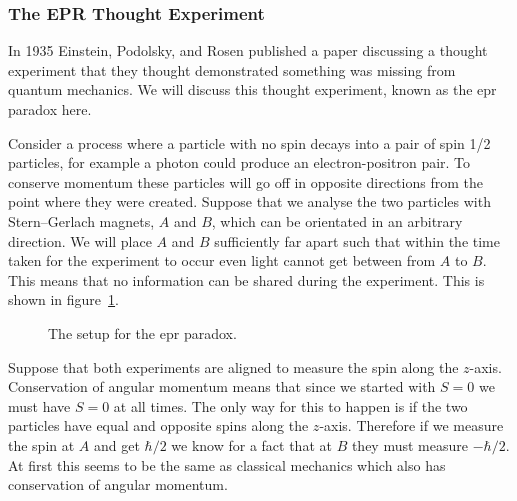     \subsubsection{The EPR Thought Experiment}
    In 1935 Einstein, Podolsky, and Rosen published a paper discussing a thought experiment that they thought demonstrated something was missing from quantum mechanics.
    We will discuss this thought experiment, known as the \gls{epr} paradox here.
    
    Consider a process where a particle with no spin decays into a pair of spin 1/2 particles, for example a photon could produce an electron-positron pair.
    To conserve momentum these particles will go off in opposite directions from the point where they were created.
    Suppose that we analyse the two particles with Stern--Gerlach magnets, \(A\) and \(B\), which can be orientated in an arbitrary direction.
    We will place \(A\) and \(B\) sufficiently far apart such that within the time taken for the experiment to occur even light cannot get between from \(A\) to \(B\).
    This means that no information can be shared during the experiment.
    This is shown in figure~\ref{fig:epr setup}.
    \begin{figure}[ht]
        \centering
        \caption{The setup for the \gls{epr} paradox.}
        \label{fig:epr setup}
    \end{figure}
    Suppose that both experiments are aligned to measure the spin along the \(z\)-axis.
    Conservation of angular momentum means that since we started with \(S = 0\) we must have \(S = 0\) at all times.
    The only way for this to happen is if the two particles have equal and opposite spins along the \(z\)-axis.
    Therefore if we measure the spin at \(A\) and get \(\hbar/2\) we know for a fact that at \(B\) they must measure \(-\hbar/2\).
    At first this seems to be the same as classical mechanics which also has conservation of angular momentum.
